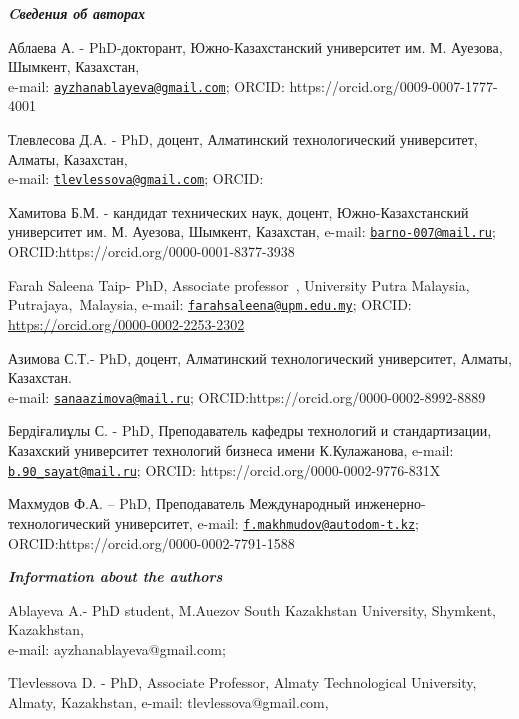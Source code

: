 \begin{authorinfo}
\emph{{\bfseries Cведения об авторах}}

Аблаева А. - PhD-докторант, Южно-Казахстанский университет им. М.
Ауезова, Шымкент, Казахстан,\\
e-mail:
\href{mailto:ayzhanablayeva@gmail.com}{\nolinkurl{ayzhanablayeva@gmail.com}};
ORCID: https://orcid.org/0009-0007-1777-4001

Тлевлесова Д.А. - PhD, доцент, Алматинский технологический университет,
Алматы, Казахстан,\\
e-mail:
\href{mailto:tlevlessova@gmail.com}{\nolinkurl{tlevlessova@gmail.com}};
ORCID:
\href{https://orcid.org/0000-0002-5084-6587}{}

Хамитова Б.М. - кандидат технических наук, доцент, Южно-Казахстанский
университет им. М. Ауезова, Шымкент, Казахстан, e-mail:
\href{mailto:barno-007@mail.ru}{\nolinkurl{barno-007@mail.ru}};
ORCID:https://orcid.org/0000-0001-8377-3938

Farah Saleena Taip- PhD, Associate professor~, University Putra
Malaysia, Putrajaya,~Malaysia, e-mail:
\href{mailto:farahsaleena@upm.edu.my}{\nolinkurl{farahsaleena@upm.edu.my}};
ORCID: \url{https://orcid.org/0000-0002-2253-2302}

Азимова С.Т.- PhD, доцент, Алматинский технологический университет,
Алматы, Казахстан.\\
e-mail:
\href{mailto:sanaazimova@mail.ru}{\nolinkurl{sanaazimova@mail.ru}};
ORCID:https://orcid.org/0000-0002-8992-8889

Бердіғалиұлы С. - PhD, Преподаватель кафедры технологий и
стандартизации, Казахский университет технологий бизнеса имени
К.Кулажанова, e-mail:
\href{mailto:b.90_sayat@mail.ru}{\nolinkurl{b.90\_sayat@mail.ru}};
ORCID: https://orcid.org/0000-0002-9776-831X

Махмудов Ф.А. -- PhD, Преподаватель Международный
инженерно-технологический университет, e-mail:
\href{mailto:f.makhmudov@autodom-t.kz}{\nolinkurl{f.makhmudov@autodom-t.kz}};
ORCID:https://orcid.org/0000-0002-7791-1588

\emph{{\bfseries Information about the authors}}

Ablayeva A.- PhD student, M.Auezov South Kazakhstan University,
Shymkent, Kazakhstan,\\
e-mail: ayzhanablayeva@gmail.com;

Tlevlessova D. - PhD, Associate Professor, Almaty Technological
University, Almaty, Kazakhstan, e-mail: tlevlessova@gmail.com,


\end{authorinfo}

